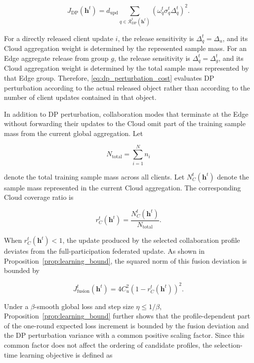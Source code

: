 \documentclass[5p,times]{elsarticle}
\theoremstyle{plain}
\theoremstyle{definition}
\theoremstyle{remark}
\begin{document}
\begin{equation}
J_{\mathrm{DP}}(\mathbf h^t)
=
d_{\mathrm{upd}}
\sum_{q\in\mathcal R_{\mathrm{DP}}^t(\mathbf h^t)}
\left(
\omega_q^t
\sigma_q^t
\Delta_q^t
\right)^2 .
\label{eq:dp_perturbation_cost}
\end{equation}

For a directly released client update \(i\), the release sensitivity is
\(\Delta_q^t=\Delta_u\), and its Cloud aggregation weight is determined by
the represented sample mass. For an Edge aggregate release from group \(g\),
the release sensitivity is \(\Delta_q^t=\Delta_g^t\), and its Cloud
aggregation weight is determined by the total sample mass represented by that
Edge group. Therefore, \eqref{eq:dp_perturbation_cost} evaluates DP
perturbation according to the actual released object rather than according to
the number of client updates contained in that object.

In addition to DP perturbation, collaboration modes that terminate at the Edge
without forwarding their updates to the Cloud omit part of the training sample
mass from the current global aggregation. Let

\begin{equation}
N_{\mathrm{total}}
=
\sum_{i=1}^{N} n_i
\label{eq:total_sample_mass}
\end{equation}

denote the total training sample mass across all clients. Let
\(N_C^t(\mathbf h^t)\) denote the sample mass represented in the current Cloud
aggregation. The corresponding Cloud coverage ratio is

\begin{equation}
r_C^t(\mathbf h^t)
=
\frac{
N_C^t(\mathbf h^t)
}{
N_{\mathrm{total}}
}.
\label{eq:cloud_mass_ratio}
\end{equation}

When \(r_C^t(\mathbf h^t)<1\), the update produced by the selected
collaboration profile deviates from the full-participation federated update.
As shown in Proposition~\ref{prop:learning_bound}, the squared norm of this
fusion deviation is bounded by

\begin{equation}
J_{\mathrm{fusion}}^t(\mathbf h^t)
=
4C_u^2
\left(
1-r_C^t(\mathbf h^t)
\right)^2 .
\label{eq:fusion_cost}
\end{equation}

Under a \(\beta\)-smooth global loss and step size
\(\eta\le 1/\beta\), Proposition~\ref{prop:learning_bound} further shows that
the profile-dependent part of the one-round expected loss increment is bounded
by the fusion deviation and the DP perturbation variance with a common
positive scaling factor. Since this common factor does not affect the ordering
of candidate profiles, the selection-time learning objective is defined as
\end{document}
